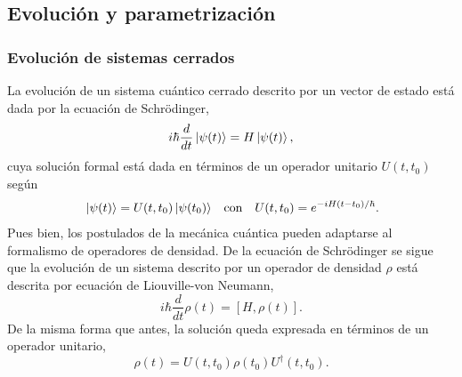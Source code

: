 \subsection{Evolución y parametrización}

\subsubsection{Evolución de sistemas cerrados}

La evolución de un sistema cuántico cerrado descrito por un vector de estado está dada por la ecuación de Schrödinger,
\begin{equation}
    i\hbar\frac{d}{dt}\ket{\psi(t)}=H\ket{\psi(t)},\nonumber
\end{equation}
cuya solución formal está dada en términos de un operador unitario $U(t,t_{0})$ según
\begin{align}
    \ket{\psi(t)}=U(t,t_{0})\ket{\psi(t_{0})} && \text{con} && U(t,t_{0})=e^{-iH(t-t_{0})/\hbar}\rlap{.}\nonumber
\end{align}
Pues bien, los postulados de la mecánica cuántica pueden adaptarse al formalismo de operadores de densidad. De la ecuación de Schrödinger se sigue que la evolución de un sistema descrito por un operador de densidad $\rho$ está descrita por ecuación de Liouville-von Neumann,
\begin{equation}
    i\hbar\frac{d}{d t} \rho(t)=[H,\rho(t)].\nonumber
\end{equation}
De la misma forma que antes, la solución queda expresada en términos de un operador unitario,
\begin{equation}
    \rho(t)=U(t,t_{0})\rho(t_{0})U^{\dagger}(t,t_{0}).\nonumber
\end{equation}
